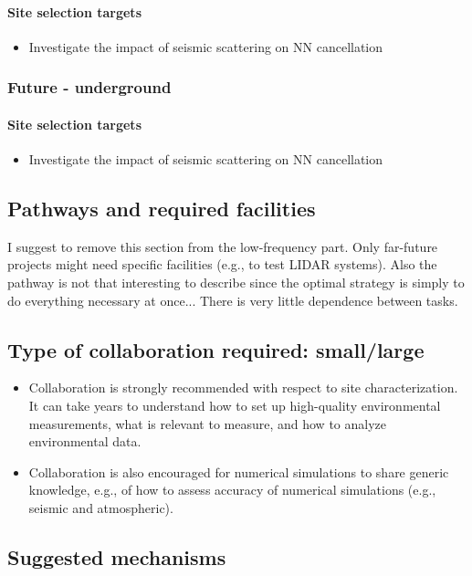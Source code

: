 \paragraph{Site selection targets}
\begin{itemize}
\item Investigate the impact of seismic scattering on NN cancellation
\end{itemize}

\subsubsection{Future - underground}
\paragraph{Site selection targets}
\begin{itemize}
\item Investigate the impact of seismic scattering on NN cancellation
\end{itemize}

\subsection{Pathways and required facilities}
I suggest to remove this section from the low-frequency part. Only far-future projects might need specific facilities (e.g., to test LIDAR systems). Also the pathway is not that interesting to describe since the optimal strategy is simply to do everything necessary at once... There is very little dependence between tasks.

\subsection{Type of collaboration required:  small/large}
\begin{itemize}
\item Collaboration is strongly recommended with respect to site characterization. It can take years to understand how to set up high-quality environmental measurements, what is relevant to measure, and how to analyze environmental data.
\item Collaboration is also encouraged for numerical simulations to share generic knowledge, e.g., of how to assess accuracy of numerical simulations (e.g., seismic and atmospheric). 
\end{itemize}

\subsection{Suggested mechanisms}

